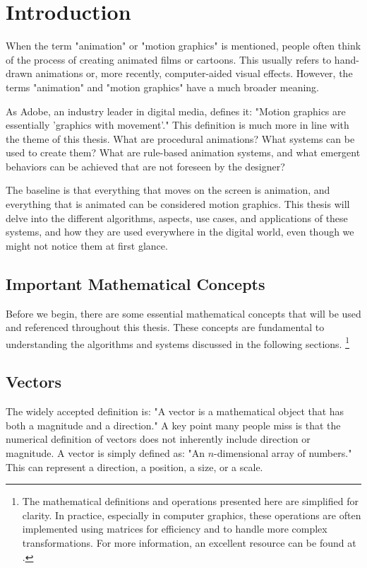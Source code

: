 \section{Introduction}
\label{sec:intro}

When the term "animation" or "motion graphics" is mentioned, people often think of the process of creating animated films or cartoons. This usually refers to hand-drawn animations or, more recently, computer-aided visual effects. However, the terms "animation" and "motion graphics" have a much broader meaning.

As Adobe, an industry leader in digital media, defines it: "Motion graphics are essentially 'graphics with movement'." \cite{adobe-motion-graphics} This definition is much more in line with the theme of this thesis. What are procedural animations? What systems can be used to create them? What are rule-based animation systems, and what emergent behaviors can be achieved that are not foreseen by the designer? 

The baseline is that everything that moves on the screen is animation, and everything that is animated can be considered motion graphics. This thesis will delve into the different algorithms, aspects, use cases, and applications of these systems, and how they are used everywhere in the digital world, even though we might not notice them at first glance.

\subsection{Important Mathematical Concepts}
\label{sec:important-mathematical-concepts}

Before we begin, there are some essential mathematical concepts that will be used and referenced throughout this thesis. These concepts are fundamental to understanding the algorithms and systems discussed in the following sections. \footnote{
    The mathematical definitions and operations presented here are simplified for clarity. In practice, especially in computer graphics, these operations are often implemented using matrices for efficiency and to handle more complex transformations. For more information, an excellent resource can be found at \cite{learn-opengl}.
}

\subsection{Vectors}
\label{sec:vectors}

The widely accepted definition is: "A vector is a mathematical object that has both a magnitude and a direction." A key point many people miss is that the numerical definition of vectors does not inherently include direction or magnitude. A vector is simply defined as: "An \(n\)-dimensional array of numbers." This can represent a direction, a position, a size, or a scale.

